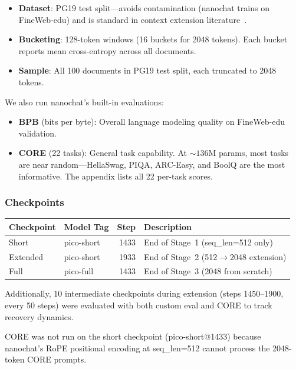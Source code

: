 \documentclass[11pt]{article}
\begin{document}
\begin{itemize}
  \item \textbf{Dataset}: PG19 test split---avoids contamination (nanochat trains on FineWeb-edu) and is standard in context extension literature~\cite{pi,yarn,longrope}.
  \item \textbf{Bucketing}: 128-token windows (16 buckets for 2048 tokens). Each bucket reports mean cross-entropy across all documents.
  \item \textbf{Sample}: All 100 documents in PG19 test split, each truncated to 2048 tokens.
\end{itemize}

We also run nanochat's built-in evaluations:
\begin{itemize}
  \item \textbf{BPB} (bits per byte): Overall language modeling quality on FineWeb-edu validation.
  \item \textbf{CORE} (22 tasks): General task capability. At ${\sim}136$M params, most tasks are near random---HellaSwag, PIQA, ARC-Easy, and BoolQ are the most informative. The appendix lists all 22 per-task scores.
\end{itemize}

\subsubsection{Checkpoints}

\begin{table}[H]
\centering\small
\begin{tabular}{@{}llrl@{}}
\toprule
Checkpoint & Model Tag & Step & Description \\
\midrule
Short & pico-short & 1433 & End of Stage~1 (seq\_len=512 only) \\
Extended & pico-short & 1933 & End of Stage~2 (512$\to$2048 extension) \\
Full & pico-full & 1433 & End of Stage~3 (2048 from scratch) \\
\bottomrule
\end{tabular}
\end{table}

Additionally, 10 intermediate checkpoints during extension (steps 1450--1900, every 50 steps) were evaluated with both custom eval and CORE to track recovery dynamics.

CORE was not run on the short checkpoint (pico-short@1433) because nanochat's RoPE positional encoding at seq\_len=512 cannot process the 2048-token CORE prompts.
\end{document}
